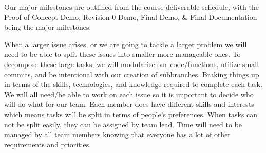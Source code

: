 \documentclass{article}
\begin{document}
	Our major milestones are outlined from the course deliverable schedule, with the Proof of Concept Demo, Revision 0 Demo, Final Demo, \& Final Documentation being the major milestones. 

	When a larger issue arises, or we are going to tackle a larger problem we will need to be able to split these issues into smaller more manageable ones. To decompose these large tasks, we will modularise our code/functions, utilize small commits, and be intentional with our creation of subbranches. Braking things up in terms of the skills, technologies, and knowledge required to complete each task. We will all need/be able to work on each issue so it is important to decide who will do what for our team. Each member does have different skills and interests which means tasks will be split in terms of people’s preferences. When tasks can not be split easily, they can be assigned by team lead. Time will need to be managed by all team members knowing that everyone has a lot of other requirements and priorities.
\end{document}
